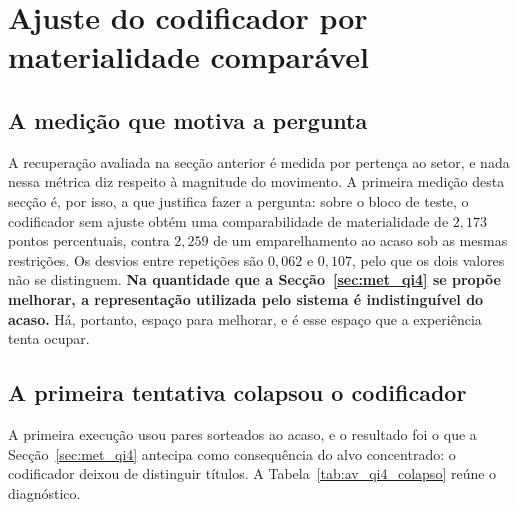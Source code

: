 \section{Ajuste do codificador por materialidade comparável}
\label{sec:av_qi4}

\subsection{A medição que motiva a pergunta}

A recuperação avaliada na secção anterior é medida por pertença ao setor, e nada nessa métrica
diz respeito à magnitude do movimento. A primeira medição desta secção é, por isso, a que
justifica fazer a pergunta: sobre o bloco de teste, o codificador sem ajuste obtém uma
comparabilidade de materialidade de $2{,}173$ pontos percentuais, contra $2{,}259$ de um
emparelhamento ao acaso sob as mesmas restrições. Os desvios entre repetições são $0{,}062$ e
$0{,}107$, pelo que os dois valores não se distinguem. \textbf{Na quantidade que a
Secção~\ref{sec:met_qi4} se propõe melhorar, a representação utilizada pelo sistema é
indistinguível do acaso.} Há, portanto, espaço para melhorar, e é esse espaço que a experiência
tenta ocupar.

\subsection{A primeira tentativa colapsou o codificador}

A primeira execução usou pares sorteados ao acaso, e o resultado foi o que a
Secção~\ref{sec:met_qi4} antecipa como consequência do alvo concentrado: o codificador deixou de
distinguir títulos. A Tabela~\ref{tab:av_qi4_colapso} reúne o diagnóstico.

